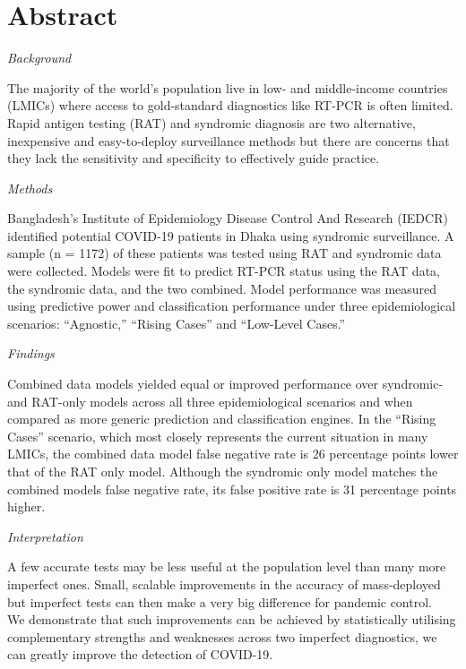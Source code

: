 \documentclass[]{elsarticle} %
\begin{document}
\hypertarget{abstract}{%
\section{Abstract}\label{abstract}}

\emph{Background}

The majority of the world's population live in low- and middle-income countries (LMICs) where access to gold-standard diagnostics like RT-PCR is often limited.
Rapid antigen testing (RAT) and syndromic diagnosis are two alternative, inexpensive and easy-to-deploy surveillance methods but there are concerns that they lack the sensitivity and specificity to effectively guide practice.

\emph{Methods}

Bangladesh's Institute of Epidemiology Disease Control And Research (IEDCR) identified potential COVID-19 patients in Dhaka using syndromic surveillance.
A sample (n = 1172) of these patients was tested using RAT and syndromic data were collected.
Models were fit to predict RT-PCR status using the RAT data, the syndromic data, and the two combined.
Model performance was measured using predictive power and classification performance under three epidemiological scenarios: ``Agnostic,'' ``Rising Cases'' and ``Low-Level Cases.''

\emph{Findings}

Combined data models yielded equal or improved performance over syndromic- and RAT-only models across all three epidemiological scenarios and when compared as more generic prediction and classification engines.
In the ``Rising Cases'' scenario, which most closely represents the current situation in many LMICs, the combined data model false negative rate is 26 percentage points lower that of the RAT only model.
Although the syndromic only model matches the combined models false negative rate, its false positive rate is 31 percentage points higher.

\emph{Interpretation}

A few accurate tests may be less useful at the population level than many more imperfect ones.
Small, scalable improvements in the accuracy of mass-deployed but imperfect tests can then make a very big difference for pandemic control.\\
We demonstrate that such improvements can be achieved by statistically utilising complementary strengths and weaknesses across two imperfect diagnostics, we can greatly improve the detection of COVID-19.
\end{document}
